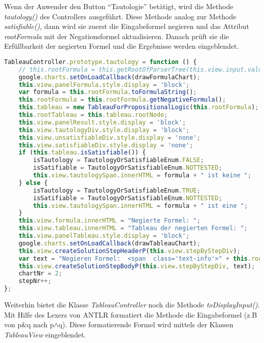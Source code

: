 Wenn der Anwender den Button ``Tautologie'' betätigt, wird die Methode \textit{tautology()} des Controllers ausgeführt. Diese Methode analog zur Methode \textit{satisfiable()}, dann wird sie zuerst die Eingabeformel negieren und das Attribut \textit{rootFormula} mit der Negationsformel aktualisieren. Danach prüft sie die Erfüllbarkeit der negierten Formel und die Ergebnisse werden eingeblendet.
\begin{lstlisting}[language=JavaScript, caption=tautology() (Klasse TableauController), basicstyle=\scriptsize] 
TableauController.prototype.tautology = function () {
    // this.rootFormula = this.getRootOfParserTree(this.view.input.value);
    google.charts.setOnLoadCallback(drawFormulaChart);
    this.view.panelFormula.style.display = 'block';
    var formula = this.rootFormula.toFormulaString();
    this.rootFormula = this.rootFormula.getNegativeFormula();
    this.tableau = new TableauForPropositionalLogic(this.rootFormula);
    this.rootTableau = this.tableau.rootNode;
    this.view.panelResult.style.display = 'block';
    this.view.tautologyDiv.style.display = 'block';
    this.view.unsatisfiableDiv.style.display = 'none';
    this.view.satisfiableDiv.style.display = 'none';
    if (this.tableau.isSatisfiable()) {
        isTautology = TautologyOrSatisfiableEnum.FALSE;
        isSatifiable = TautologyOrSatisfiableEnum.NOTTESTED;
        this.view.tautologySpan.innerHTML = formula + " ist keine ";
    } else {
        isTautology = TautologyOrSatisfiableEnum.TRUE;
        isSatifiable = TautologyOrSatisfiableEnum.NOTTESTED;
        this.view.tautologySpan.innerHTML = formula + " ist eine ";
    }
    this.view.formula.innerHTML = "Negierte Formel: ";
    this.view.tableau.innerHTML = "Tableau der negierten Formel: ";
    this.view.panelTableau.style.display = 'block';
    google.charts.setOnLoadCallback(drawTableauChart);
    this.view.createSolutionStepHeaderP(this.view.stepByStepDiv);
    var text = "Negieren Formel:  <span  class='text-info'>" + this.rootFormula.toFormulaString() + "</span>";
    this.view.createSolutionStepBodyP(this.view.stepByStepDiv, text);
    chartNr = 2;
    stepNr++;
};
\end{lstlisting}

Weiterhin bietet die Klasse \textit{TableauController} noch die Methode \textit{toDisplayInput()}. Mit Hilfe des Lexers von ANTLR formatiert die Methode die Eingabeformel (z.B von p\&q nach p$\wedge$q). Diese formatierende Formel wird mittels der Klassen \textit{TableauView} eingeblendet.	